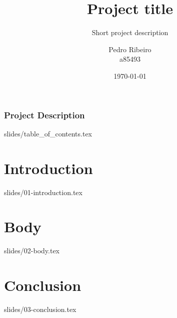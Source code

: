 \documentclass{beamer}
\begin{document}
\title{Project title}
\subtitle{\tiny{Short project description}}

\author[]{%
    \parbox{2.5cm}{%
        \centering Pedro Ribeiro\\a85493
    }%
}


\date{\today}


\begin{frame}
    \frametitle{Project Description}
    \titlepage
\end{frame}

{slides/table_of_contents.tex}

\section{Introduction}
{slides/01-introduction.tex}

\section{Body}
{slides/02-body.tex}

\section{Conclusion}
{slides/03-conclusion.tex}
\end{document}
